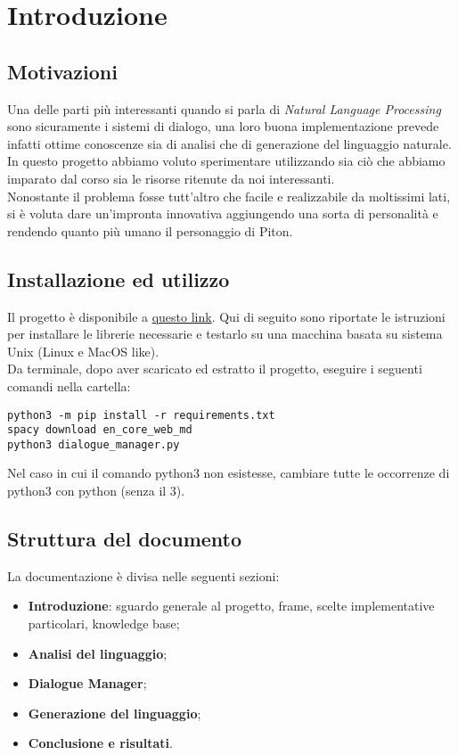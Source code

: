 \section{Introduzione}

\subsection{Motivazioni}
Una delle parti più interessanti quando si parla di \textit{Natural Language Processing} sono sicuramente i sistemi di dialogo, una loro buona implementazione prevede infatti ottime conoscenze sia di analisi che di generazione del linguaggio naturale. In questo progetto abbiamo voluto sperimentare utilizzando sia ciò che abbiamo imparato dal corso sia le risorse ritenute da noi interessanti.
\\
Nonostante il problema fosse tutt'altro che facile e realizzabile da moltissimi lati, si è voluta dare un'impronta innovativa aggiungendo una sorta di personalità e rendendo quanto più umano il personaggio di Piton.

\subsection{Installazione ed utilizzo}
Il progetto è disponibile a \href{https://github.com/federicotorrielli/pitonNLG}{questo link}. Qui di seguito sono riportate le istruzioni per installare le librerie necessarie e testarlo su una macchina basata su sistema Unix (Linux e MacOS like).
\\
Da terminale, dopo aver scaricato ed estratto il progetto, eseguire i seguenti comandi nella cartella:
\lstset{
  language=bash,
  basicstyle=\ttfamily
}
\begin{lstlisting}
python3 -m pip install -r requirements.txt
spacy download en_core_web_md
python3 dialogue_manager.py
\end{lstlisting}
Nel caso in cui il comando python3 non esistesse, cambiare tutte le occorrenze di python3 con python (senza il 3).

\subsection{Struttura del documento}
La documentazione è divisa nelle seguenti sezioni:
\begin{itemize}
    \item \textbf{Introduzione}: sguardo generale al progetto, frame, scelte implementative particolari, knowledge base;
    \item \textbf{Analisi del linguaggio};
    \item \textbf{Dialogue Manager};
    \item \textbf{Generazione del linguaggio};
    \item \textbf{Conclusione e risultati}.
\end{itemize}


